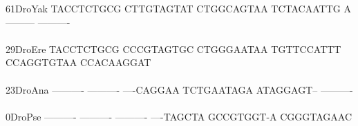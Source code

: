 \documentclass[11pt,twoside,reqno,a4paper]{article}
\begin{document}
{61\hspace*{2\charwidth}DroYak	TACCTCTGCG	CTTGTAGTAT	CTGGCAGTAA	TCTACAATTG	A---------	----------	\\
\hspace*{4\charwidth}\hspace*{7\charwidth}\hspace*{1\charwidth}\hspace*{1\charwidth}\hspace*{1\charwidth}\hspace*{1\charwidth}\hspace*{1\charwidth}\hspace*{1\charwidth}\\
29\hspace*{2\charwidth}DroEre	TACCTCTGCG	CCCGTAGTGC	CTGGGAATAA	TGTTCCATTT	CCAGGTGTAA	CCACAAGGAT	\\
\hspace*{4\charwidth}\hspace*{7\charwidth}\hspace*{1\charwidth}\hspace*{1\charwidth}\hspace*{1\charwidth}\hspace*{1\charwidth}\hspace*{1\charwidth}\hspace*{1\charwidth}\\
23\hspace*{2\charwidth}DroAna	----------	----------	----CAGGAA	TCTGAATAGA	ATAGGAGT--	----------	\\
\hspace*{4\charwidth}\hspace*{7\charwidth}\hspace*{1\charwidth}\hspace*{1\charwidth}\hspace*{1\charwidth}\hspace*{1\charwidth}\hspace*{1\charwidth}\hspace*{1\charwidth}\\
0\hspace*{3\charwidth}DroPse	----------	----------	----------	----TAGCTA	GCCGTGGT-A	CGGGTAGAAC	\\
\hspace*{4\charwidth}\hspace*{7\charwidth}\hspace*{1\charwidth}\hspace*{1\charwidth}\hspace*{1\charwidth}\hspace*{1\charwidth}\hspace*{1\charwidth}\hspace*{1\charwidth}\\
}
\end{document}
